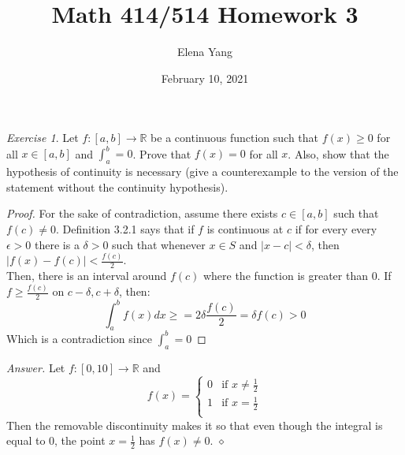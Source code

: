 \documentclass[12pt,oneside]{amsart}
\title{Math 414/514 Homework 3}
\author{Elena Yang}
\date{February 10, 2021}
\theoremstyle{definition}
\theoremstyle{remark}
\newtheorem{exer}{Exercise}
\numberwithin{equation}{exer}
\newenvironment{answer}{\bigskip\noindent\emph{Answer.}}{\hfill$\diamond$\newline}
\begin{document}
\maketitle


\begin{exer}
Let $f:[a,b]\rightarrow \mathbb{R}$ be a continuous function such that $f(x)\geq 0$ for all $x\in [a,b]$ and $\int_{a}^{b}=0$. Prove that $f(x)=0$ for all $x$. Also, show that the hypothesis of continuity is necessary (give a counterexample to the version of the statement without the continuity hypothesis).
\end{exer}
\begin{proof}
For the sake of contradiction, assume there exists $c \in [a,b]$ such that $f(c) \neq 0$. Definition 3.2.1 says that if $f$ is continuous at $c$ if for every every $\epsilon >0$ there is a $\delta >0$ such that whenever $x \in S$ and $|x-c|<\delta$, then $|f(x)-f(c)|<\frac{f(c)}{2}$. \\
Then, there is an interval around $f(c)$ where the function is greater than 0. If $f\geq \frac{f(c)}{2}$ on $c-\delta,c+\delta$, then: 
$$\int_{a}^{b}f(x)dx\geq =2\delta \frac{f(c)}{2}=\delta f(c) >0$$
Which is a contradiction since $\int_{a}^{b}=0$
\end{proof}
\begin{answer}
Let $f:[0,10]\rightarrow\mathbb{R}$ and 
\[
  f(x) =
  \begin{cases}
                                   0 & \text{if $x\neq \frac{1}{2}$} \\
                                   1 & \text{if $x=\frac{1}{2}$} \\
  \end{cases}
\]
Then the removable discontinuity makes it so that even though the integral is equal to 0, the point $x=\frac{1}{2}$ has $f(x)\neq 0$.
\end{answer}
\end{document}
